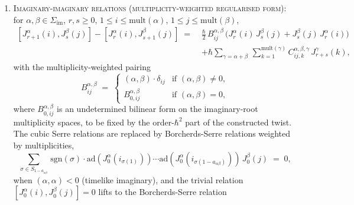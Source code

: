 \begin{conjecture}
\begin{enumerate}[label=\textup{(J\arabic*)}]
\begin{align*}
 [e^\alpha_r, J^\beta_s(i)] &= \sum_{j=1}^{\mathrm{mult}(\beta)} M^{\alpha, \beta}_{ij}(\hbar)\, J^{\beta + \alpha}_{r + s}(j),
\end{align*}
where $M^{\alpha, \beta}_{ij}(\hbar) \in \C\llbracket\hbar\rrbracket$ is the real-imaginary coupling matrix, determined by the Fourier coefficients of $\tFM$ in Definition~\ref{def:fm-theta-cocycle} through
\[
 M^{\alpha, \beta}_{ij}(\hbar) \;=\; \epsilon(\alpha, \beta)\cdot \delta_{ij} + O(\hbar),
\]
with $\epsilon$ the Borcherds sign bicharacter and $\delta_{ij}$ the Kronecker delta on the imaginary-root multiplicity basis. When $(\alpha, \beta) = 0$ the commutator is homogeneous of degree $r + s$; when $(\alpha, \beta) \neq 0$ the Weyl-reflected root $\beta + \alpha$ has its own multiplicity-indexed current $J^{\beta + \alpha}_{r+s}(j)$.
\item \textsc{Imaginary-imaginary relations (multiplicity-weighted regularised form)}: for $\alpha, \beta \in \Sigma_{\mathrm{im}}$, $r, s \geq 0$, $1 \leq i \leq \mathrm{mult}(\alpha)$, $1 \leq j \leq \mathrm{mult}(\beta)$,
\begin{equation}
\label{eq:fm-J-imim-relation}
\begin{aligned}
 [J^\alpha_{r+1}(i), J^\beta_s(j)] - [J^\alpha_r(i), J^\beta_{s+1}(j)]
 \;=\;
 &\tfrac{\hbar}{2}\, B^{\alpha, \beta}_{ij}\,\bigl(J^\alpha_r(i)\, J^\beta_s(j) + J^\beta_s(j)\, J^\alpha_r(i)\bigr) \\
 &+ \hbar\sum_{\gamma = \alpha + \beta}\,\sum_{k=1}^{\mathrm{mult}(\gamma)} C^{\alpha, \beta, \gamma}_{ij, k}\, J^{\gamma}_{r + s}(k),
\end{aligned}
\end{equation}
with the multiplicity-weighted pairing
\[
 B^{\alpha, \beta}_{ij}
 \;=\;
 \begin{cases}
 (\alpha, \beta) \cdot \delta_{ij} & \text{if } (\alpha, \beta) \neq 0, \\
 B^{\alpha,\beta}_{0,ij} & \text{if } (\alpha, \beta) = 0,
 \end{cases}
\]
where $B^{\alpha,\beta}_{0,ij}$ is an undetermined bilinear form on the
imaginary-root multiplicity spaces, to be fixed by the order-$\hbar^2$
part of the constructed twist. The cubic Serre relations are replaced by Borcherds-Serre relations weighted by multiplicities,
\[
 \sum_{\sigma \in S_{1 - a_{\alpha\beta}}}\,\mathrm{sgn}(\sigma)\cdot \mathrm{ad}(J^\alpha_0(i_{\sigma(1)}))\cdots \mathrm{ad}(J^\alpha_0(i_{\sigma(1 - a_{\alpha\beta})})) \, J^\beta_0(j) \;=\; 0,
\]
when $(\alpha, \alpha) < 0$ (timelike imaginary), and the trivial relation $[J^\alpha_0(i), J^\beta_0(j)] = 0$ lifts to the Borcherds-Serre relation

\end{enumerate}
\end{conjecture}
